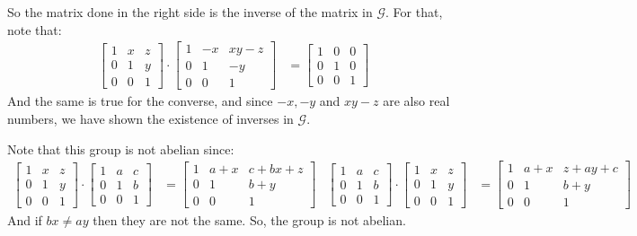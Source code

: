 \documentclass[final,expand]{problemset}
\begin{document}
{\begin{itemize}
		So the matrix done in the right side is the inverse of the matrix in $\mathcal{G}$. For that, note that:
		\begin{align*}
			\begin{bmatrix}
				1 & x & z\\ 0 & 1 & y\\ 0 & 0 & 1
			\end{bmatrix} \cdot \begin{bmatrix}
				1 & -x & xy-z\\ 0 & 1 & -y\\ 0 & 0 & 1
			\end{bmatrix} &= \begin{bmatrix}
				1 & 0 & 0\\ 0 & 1 & 0\\ 0 & 0 & 1
			\end{bmatrix}
		\end{align*}
		And the same is true for the converse, and since $-x, -y$ and $xy-z$ are also real numbers, we have shown the existence of inverses in $\mathcal{G}$.
	\end{itemize}

	Note that this group is not abelian since:
	\begin{align*}
		\begin{bmatrix}
			1 & x & z\\ 0 & 1 & y\\ 0 & 0 & 1
		\end{bmatrix} \cdot \begin{bmatrix}
			1 & a & c\\ 0 & 1 & b\\ 0 & 0 & 1
		\end{bmatrix} &= \begin{bmatrix}
			1 & a +x & c + bx + z\\ 0 & 1 & b+y\\ 0 & 0 & 1
		\end{bmatrix} & \begin{bmatrix}
			1 & a & c\\ 0 & 1 & b\\ 0 & 0 & 1
		\end{bmatrix} \cdot \begin{bmatrix}
			1 & x & z\\ 0 & 1 & y\\ 0 & 0 & 1
		\end{bmatrix} &= \begin{bmatrix}
			1 & a + x & z + ay + c\\ 0 & 1 & b + y\\ 0 & 0& 1
		\end{bmatrix}
	\end{align*}
	And if $bx \neq ay$ then they are not the same. So, the group is not abelian.
}
\end{document}
